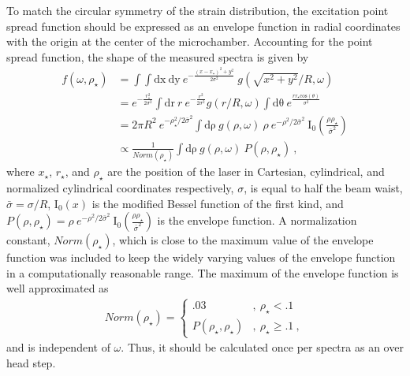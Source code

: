 To match the circular symmetry of the strain distribution, the excitation point spread function should be expressed as an envelope function in radial coordinates with the origin at the center of the microchamber.
Accounting for the point spread function, the shape of the measured spectra is given by
\begin{align*}
	f(\omega,\rho_{\star})&=
		\int \int \mathrm{dx} \ \mathrm{dy} \ e^{-\frac{(x-x_{\star})^2+y^2}{2 \sigma^2}} \ g(\sqrt{x^2+y^2}/R,\omega) \\
	&=e^{-\frac{r_{\star}^2}{2 \sigma^2}} \int  \mathrm{dr} \ r \ e^{-\frac{r^2}{2 \sigma^2}} g(r/R,\omega) 
		\int \mathrm{d \theta} \ e^{\frac{r r_{\star} \mathrm{cos}(\theta)}{\sigma^2}} \\
	&=2\pi R^2 \ e^{-\rho_{\star}^2/2 \bar{\sigma}^2} \int \mathrm{d \rho} \ g(\rho,\omega) \
		\rho \ e^{-\rho^2/2 \bar{\sigma}^2} \
		\mathrm{I}_{0} \left( \frac{\rho \rho_{\star}}{\bar{\sigma}^2} \right) \\
	&\propto \frac{1}{Norm(\rho_{\star})} \int \mathrm{d \rho} \ g(\rho,\omega) \ P(\rho,\rho_{\star}) \ ,
\end{align*}
where $x_{\star}$, $r_{\star}$, and $\rho_{\star}$ are the position of the laser in Cartesian, cylindrical, and normalized cylindrical coordinates respectively, $\sigma$, is equal to half the beam waist, $\bar{\sigma}=\sigma/R$, $\mathrm{I}_0(x)$ is the modified Bessel function of the first kind, and $P(\rho,\rho_{\star})=\rho \ e^{-\rho^2/2 \bar{\sigma}^2} \ \mathrm{I}_0 \left( \frac{\rho \rho_{\star}}{\bar{\sigma}^2} \right)$ is the envelope function.
A normalization constant, $Norm(\rho_{\star})$, which is close to the maximum value of the envelope function was included to keep the widely varying values of the envelope function in a computationally reasonable range.
The maximum of the envelope function is well approximated as
\begin{align*}
	Norm(\rho_{\star})=
		\begin{cases}
			.03 							& , \ \rho_{\star} <    .1 \\
			P(\rho_{\star}, \rho_{\star})	& , \ \rho_{\star} \geq .1 \ ,
		\end{cases}
\end{align*}
and is independent of $\omega$.
Thus, it should be calculated once per spectra as an over head step.

